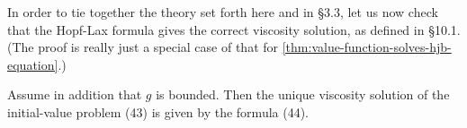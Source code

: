 In order to tie together the theory set forth here and in \S3.3, let us now check that the Hopf-Lax formula gives the correct viscosity solution, as defined in \S10.1. (The proof is really just a special case of that for \cref{thm:value-function-solves-hjb-equation}.)

\begin{theorem}
\label{thm:hopf-lax-formula-viscosity-solution}
Assume in addition that $g$ is bounded. Then the unique viscosity solution of the initial-value problem (43) is given by the formula (44).
\end{theorem}
